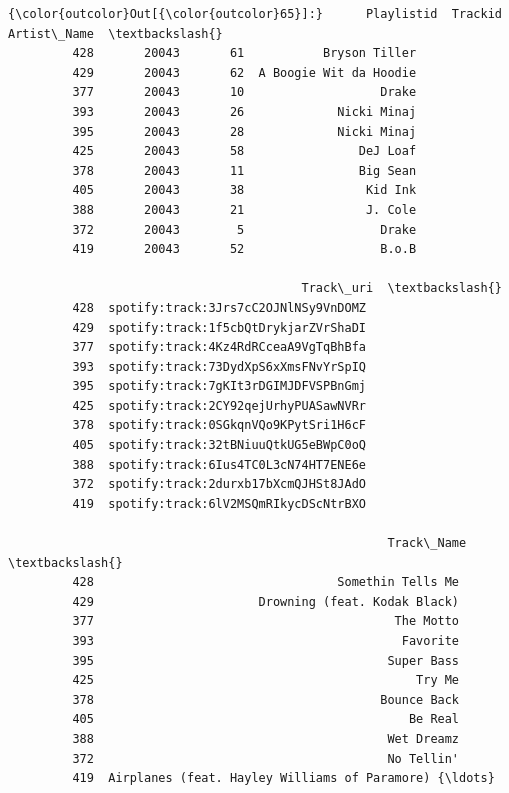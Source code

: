 \documentclass[11pt]{article}
\begin{document}
\begin{Verbatim}[commandchars=\\\{\}]
{\color{outcolor}Out[{\color{outcolor}65}]:}      Playlistid  Trackid             Artist\_Name  \textbackslash{}
         428       20043       61           Bryson Tiller   
         429       20043       62  A Boogie Wit da Hoodie   
         377       20043       10                   Drake   
         393       20043       26             Nicki Minaj   
         395       20043       28             Nicki Minaj   
         425       20043       58                DeJ Loaf   
         378       20043       11                Big Sean   
         405       20043       38                 Kid Ink   
         388       20043       21                 J. Cole   
         372       20043        5                   Drake   
         419       20043       52                   B.o.B   
         
                                         Track\_uri  \textbackslash{}
         428  spotify:track:3Jrs7cC2OJNlNSy9VnDOMZ   
         429  spotify:track:1f5cbQtDrykjarZVrShaDI   
         377  spotify:track:4Kz4RdRCceaA9VgTqBhBfa   
         393  spotify:track:73DydXpS6xXmsFNvYrSpIQ   
         395  spotify:track:7gKIt3rDGIMJDFVSPBnGmj   
         425  spotify:track:2CY92qejUrhyPUASawNVRr   
         378  spotify:track:0SGkqnVQo9KPytSri1H6cF   
         405  spotify:track:32tBNiuuQtkUG5eBWpC0oQ   
         388  spotify:track:6Ius4TC0L3cN74HT7ENE6e   
         372  spotify:track:2durxb17bXcmQJHSt8JAdO   
         419  spotify:track:6lV2MSQmRIkycDScNtrBXO   
         
                                                     Track\_Name  \textbackslash{}
         428                                  Somethin Tells Me   
         429                       Drowning (feat. Kodak Black)   
         377                                          The Motto   
         393                                           Favorite   
         395                                         Super Bass   
         425                                             Try Me   
         378                                        Bounce Back   
         405                                            Be Real   
         388                                         Wet Dreamz   
         372                                         No Tellin'   
         419  Airplanes (feat. Hayley Williams of Paramore) {\ldots}   
         

\end{Verbatim}
\end{document}
